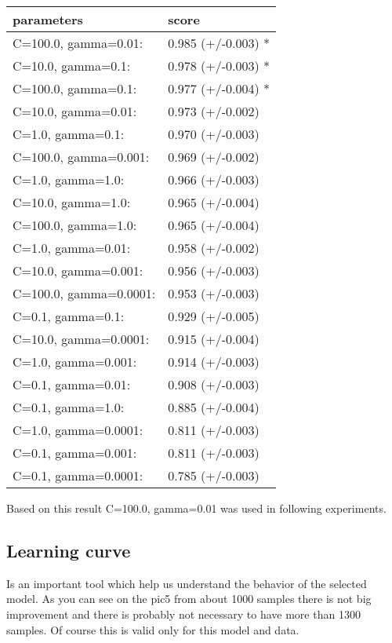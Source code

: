 \documentclass[11pt]{article}
\begin{document}
\begin{center}
\begin{tabular}{ll}
 parameters              &  score               \\
\hline
 C=100.0, gamma=0.01:    &  0.985 (+/-0.003) *  \\
 C=10.0, gamma=0.1:      &  0.978 (+/-0.003) *  \\
 C=100.0, gamma=0.1:     &  0.977 (+/-0.004) *  \\
 C=10.0, gamma=0.01:     &  0.973 (+/-0.002)    \\
 C=1.0, gamma=0.1:       &  0.970 (+/-0.003)    \\
 C=100.0, gamma=0.001:   &  0.969 (+/-0.002)    \\
 C=1.0, gamma=1.0:       &  0.966 (+/-0.003)    \\
 C=10.0, gamma=1.0:      &  0.965 (+/-0.004)    \\
 C=100.0, gamma=1.0:     &  0.965 (+/-0.004)    \\
 C=1.0, gamma=0.01:      &  0.958 (+/-0.002)    \\
 C=10.0, gamma=0.001:    &  0.956 (+/-0.003)    \\
 C=100.0, gamma=0.0001:  &  0.953 (+/-0.003)    \\
 C=0.1, gamma=0.1:       &  0.929 (+/-0.005)    \\
 C=10.0, gamma=0.0001:   &  0.915 (+/-0.004)    \\
 C=1.0, gamma=0.001:     &  0.914 (+/-0.003)    \\
 C=0.1, gamma=0.01:      &  0.908 (+/-0.003)    \\
 C=0.1, gamma=1.0:       &  0.885 (+/-0.004)    \\
 C=1.0, gamma=0.0001:    &  0.811 (+/-0.003)    \\
 C=0.1, gamma=0.001:     &  0.811 (+/-0.003)    \\
 C=0.1, gamma=0.0001:    &  0.785 (+/-0.003)    \\
\end{tabular}
\end{center}



   Based on this result C=100.0, gamma=0.01 was used in following experiments.

\subsection{Learning curve}
\label{sec-1.5}

   Is an important tool which help us understand the behavior of the
   selected model. As you can see on the pic5 from about 1000 samples
   there is not big improvement and there is probably not necessary to
   have more than 1300 samples. Of course this is valid only for this
   model and data.
\end{document}
